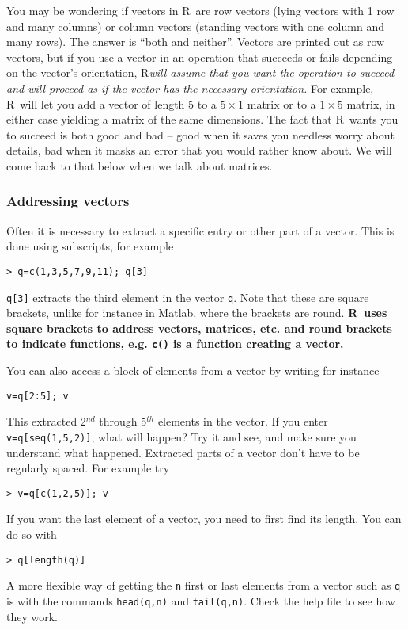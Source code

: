 \documentclass [11pt]{article}
\newcommand{\code}[1]{{\tt #1}}
\newcommand\R{{\sf R}}
\numberwithin{exercise}{section}
\begin{document}
You may be wondering if vectors in \R\ are row vectors (lying vectors with 1 row and many columns) or column vectors (standing vectors with one column and many rows). 
The answer is ``both and neither''. Vectors are printed out as row vectors, but if you use a vector in 
an operation that succeeds or fails depending on the vector's orientation, 
\R \textit{will assume that you want the operation to succeed and will proceed as 
if the vector has the necessary orientation.} For example, \R\ will let
you add a vector of length 5 to a $5 \times 1$ matrix or to a 
$1 \times 5$ matrix, in either case yielding a matrix of the 
same dimensions. The fact that \R\ wants you to succeed is both good and
bad -- good when it saves you needless worry about details, bad when it masks an error that you would rather know about. 
We will come back to that below when we talk about matrices.

\subsubsection{Addressing vectors} 
Often it is necessary to extract a specific 
entry or other part of a vector. This is done using subscripts, for example
\vspace{-0.1in}
\begin{verbatim}
> q=c(1,3,5,7,9,11); q[3]
\end{verbatim}
\vspace{-0.1in}
\texttt{q[3]} extracts the third element in the vector \texttt{q}. Note that these are square brackets, unlike for instance in Matlab, where the brackets are round. {\bf \R\ uses square brackets to address vectors, matrices, etc. and round brackets to indicate functions, e.g. \code{c()} is a function creating a vector.} 

You can also access a block of elements from a vector by writing for instance 
\vspace{-0.1in}
\begin{verbatim}
v=q[2:5]; v
\end{verbatim}
\vspace{-0.1in}
This extracted 2$^{nd}$ through 5$^{th}$ elements in the vector. 
If you enter \texttt{v=q[seq(1,5,2)]}, what will happen? Try it
and see, and make sure you understand what happened. 
Extracted parts of a vector don't have to be regularly spaced. For example try
\vspace{-0.1in}
\begin{verbatim}
> v=q[c(1,2,5)]; v
\end{verbatim}
\vspace{-0.1in}
If you want the last element of a vector, you need to first find its length. You can do so with
\vspace{-0.1in}
\begin{verbatim}
> q[length(q)]
\end{verbatim}
\vspace{-0.1in}
A more flexible way of getting the \code{n} first or last elements from a vector such as \code{q} is with the commands \code{head(q,n)} and \code{tail(q,n)}. Check the help file to see how they work.
\end{document}

